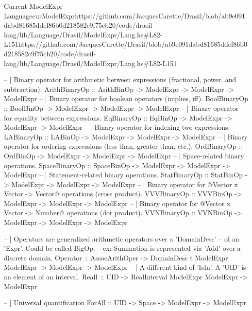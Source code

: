 \begin{haskell}{Current ModelExpr Language}{curModelExpr}{https://github.com/JacquesCarette/Drasil/blob/ab9e091dabd81685ddef86b0d218582c9f75c\newline{}b20/code/drasil-lang/lib/Language/Drasil/ModelExpr/Lang.hs\#L82-L151}{https://github.com/JacquesCarette/Drasil/blob/ab9e091dabd81685ddef86b0d218582c9f75cb20/code/drasil-lang/lib/Language/Drasil/ModelExpr/Lang.hs\#L82-L151}
  
  -- | Binary operator for arithmetic between expressions (fractional, power, and subtraction).
  ArithBinaryOp :: ArithBinOp -> ModelExpr -> ModelExpr -> ModelExpr
  -- | Binary operator for boolean operators (implies, iff).
  BoolBinaryOp  :: BoolBinOp -> ModelExpr -> ModelExpr -> ModelExpr
  -- | Binary operator for equality between expressions.
  EqBinaryOp    :: EqBinOp -> ModelExpr -> ModelExpr -> ModelExpr
  -- | Binary operator for indexing two expressions.
  LABinaryOp    :: LABinOp -> ModelExpr -> ModelExpr -> ModelExpr
  -- | Binary operator for ordering expressions (less than, greater than, etc.).
  OrdBinaryOp   :: OrdBinOp -> ModelExpr -> ModelExpr -> ModelExpr
  -- | Space-related binary operations.
  SpaceBinaryOp :: SpaceBinOp -> ModelExpr -> ModelExpr -> ModelExpr
  -- | Statement-related binary operations.
  StatBinaryOp  :: StatBinOp -> ModelExpr -> ModelExpr -> ModelExpr
  -- | Binary operator for @Vector x Vector -> Vector@ operations (cross product).
  VVVBinaryOp   :: VVVBinOp -> ModelExpr -> ModelExpr -> ModelExpr
  -- | Binary operator for @Vector x Vector -> Number@ operations (dot product).
  VVNBinaryOp   :: VVNBinOp -> ModelExpr -> ModelExpr -> ModelExpr
  
  
  -- | Operators are generalized arithmetic operators over a 'DomainDesc'
  --   of an 'Expr'.  Could be called BigOp.
  --   ex: Summation is represented via 'Add' over a discrete domain.
  Operator :: AssocArithOper -> DomainDesc t ModelExpr ModelExpr -> ModelExpr -> ModelExpr
  -- | A different kind of 'IsIn'. A 'UID' is an element of an interval.
  RealI    :: UID -> RealInterval ModelExpr ModelExpr -> ModelExpr
  
  -- | Universal quantification
  ForAll   :: UID -> Space -> ModelExpr -> ModelExpr
\end{haskell}

